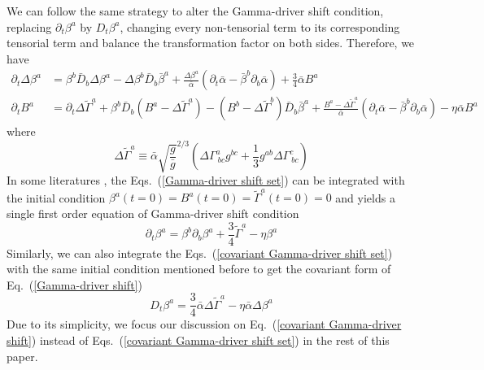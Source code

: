 We can follow the same strategy to alter the Gamma-driver shift condition, replacing $\partial_{t}\beta^{a}$ by $D_{t}\beta^{a}$, changing every non-tensorial term to its corresponding tensorial term and balance the transformation factor on both sides. Therefore, we have
\begin{subequations}\label{covariant Gamma-driver shift set}
\begin{align}
\partial_{t}\Delta \beta^{a} & = \beta^{b}{\bar D}_{b}\Delta\beta^{a} - \Delta \beta^{b}{\bar D}_{b}{\bar \beta}^{a} + \frac{\Delta\beta^{a}}{{\bar \alpha}}\left(\partial_{t}{\bar \alpha} - {\bar \beta}^{b}\partial_{b}{\bar \alpha}\right) + \frac{3}{4}{\bar \alpha}B^{a}\\
\partial_{t}B^{a} & = \partial_{t}\Delta {\tilde \Gamma}^{a} + \beta^{b}{\bar D}_{b}\left(B^{a} - \Delta{\tilde \Gamma}^{a}\right) - \left(B^{b} - \Delta{\tilde \Gamma}^{b}\right){\bar D}_{b}{\bar \beta}^{a} + \frac{B^{a} - \Delta{\tilde \Gamma}^{a}}{{\bar \alpha}}\left(\partial_{t}{\bar \alpha} - {\bar \beta}^{b}\partial_{b}{\bar \alpha}\right) - \eta{\bar \alpha}B^{a}
\end{align}
\end{subequations}
where
\begin{equation}
\Delta {\tilde \Gamma}^{a} \equiv {\bar \alpha}\sqrt{\frac{g}{{\bar g}}}^{2/3}\left(\Delta \Gamma^{a}_{~bc}g^{bc} + \frac{1}{3}g^{ab}\Delta \Gamma^{c}_{~bc}\right)
\end{equation}
In some literatures \cite{vanMeter:2006vi}, the Eqs.~(\ref{Gamma-driver shift set}) can be integrated with the initial condition $\beta^{a}\left(t=0\right) = B^{a}\left(t=0\right) = {\tilde \Gamma}^{a}\left(t = 0\right) = 0$ and yields a single first order equation of Gamma-driver shift condition
\begin{equation}\label{Gamma-driver shift}
\partial_{t}\beta^{a} = \beta^{b}\partial_{b}\beta^{a} + \frac{3}{4}{\tilde \Gamma}^{a} - \eta \beta^{a}
\end{equation} 
Similarly, we can also integrate the Eqs.~(\ref{covariant Gamma-driver shift set}) with the same initial condition mentioned before to get the covariant form of Eq.~(\ref{Gamma-driver shift})
\begin{equation}\label{covariant Gamma-driver shift}
D_{t}\beta^{a} = \frac{3}{4}{\bar \alpha}\Delta {\tilde \Gamma}^{a} - \eta {\bar \alpha}\Delta\beta^{a}
\end{equation}
Due to its simplicity, we focus our discussion on Eq.~(\ref{covariant Gamma-driver shift}) instead of Eqs.~(\ref{covariant Gamma-driver shift set}) in the rest of this paper.

